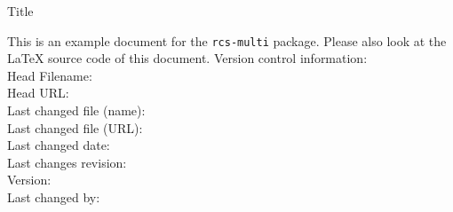 \documentclass[12pt]{report}
\begin{document}
\begin{titlepage}
 \hbox{}
 \vspace{8ex}
 {\huge Title\par}
 \vspace{2ex}
 {\large \noindent This is an example document for the \texttt{rcs-multi}
  package. Please also look at the LaTeX source code of this
 document.}
 \vfill
 \flushleft\sffamily
 Version control information:\\
 Head Filename: \rcsnolinkurl{\rcsmainfilename}\\
 Head URL: \rcsnolinkurl{\rcsmainfileurl}\\
 Last changed file (name): \rcsnolinkurl{\rcsname}\\
 Last changed file (URL): \rcsnolinkurl{\rcsurl}\\
 Last changed date: \rcsdate\\
 Last changes revision: \rcsrev\\
 Version: \rcsFullRevision*{\rcsrev}\\
 Last changed by: \rcsFullAuthor*{\rcsauthor}\\
\end{titlepage}



%
\end{document}
